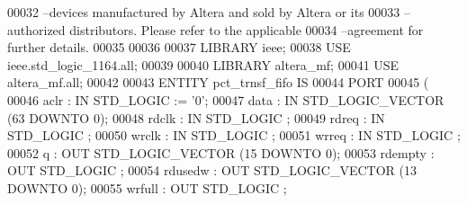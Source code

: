 \begin{DoxyCode}
{00032 \textcolor{keyword}{--devices manufactured by Altera and sold by Altera or its }
00033 \textcolor{keyword}{--authorized distributors.  Please refer to the applicable }
00034 \textcolor{keyword}{--agreement for further details.}
00035 
00036 
00037 \textcolor{vhdlkeyword}{LIBRARY }\textcolor{keywordflow}{ieee};
00038 \textcolor{vhdlkeyword}{USE }ieee.std\_logic\_1164.\textcolor{keywordflow}{all};
00039 
00040 \textcolor{vhdlkeyword}{LIBRARY }\textcolor{keywordflow}{altera\_mf};
00041 \textcolor{vhdlkeyword}{USE }\textcolor{keywordflow}{altera\_mf.all};
00042 
00043 \textcolor{keywordflow}{ENTITY }pct_trnsf_fifo \textcolor{keywordflow}{IS}
00044     \textcolor{keywordflow}{PORT}
00045     \textcolor{vhdlchar}{(}
00046         \textcolor{vhdlchar}{aclr}        \textcolor{vhdlchar}{:} \textcolor{keywordflow}{IN} \textcolor{comment}{STD\_LOGIC}  \textcolor{vhdlchar}{:=} \textcolor{vhdlchar}{'}\textcolor{vhdllogic}{}\textcolor{vhdllogic}{0}\textcolor{vhdlchar}{'};
00047         \textcolor{vhdlchar}{data}        \textcolor{vhdlchar}{:} \textcolor{keywordflow}{IN} \textcolor{comment}{STD\_LOGIC\_VECTOR} \textcolor{vhdlchar}{(}\textcolor{vhdllogic}{}\textcolor{vhdllogic}{63} \textcolor{keywordflow}{DOWNTO} \textcolor{vhdllogic}{}\textcolor{vhdllogic}{0}\textcolor{vhdlchar}{)};
00048         \textcolor{vhdlchar}{rdclk}       \textcolor{vhdlchar}{:} \textcolor{keywordflow}{IN} \textcolor{comment}{STD\_LOGIC} ;
00049         \textcolor{vhdlchar}{rdreq}       \textcolor{vhdlchar}{:} \textcolor{keywordflow}{IN} \textcolor{comment}{STD\_LOGIC} ;
00050         \textcolor{vhdlchar}{wrclk}       \textcolor{vhdlchar}{:} \textcolor{keywordflow}{IN} \textcolor{comment}{STD\_LOGIC} ;
00051         \textcolor{vhdlchar}{wrreq}       \textcolor{vhdlchar}{:} \textcolor{keywordflow}{IN} \textcolor{comment}{STD\_LOGIC} ;
00052         \textcolor{vhdlchar}{q}       \textcolor{vhdlchar}{:} \textcolor{keywordflow}{OUT} \textcolor{comment}{STD\_LOGIC\_VECTOR} \textcolor{vhdlchar}{(}\textcolor{vhdllogic}{}\textcolor{vhdllogic}{15} \textcolor{keywordflow}{DOWNTO} \textcolor{vhdllogic}{}\textcolor{vhdllogic}{0}\textcolor{vhdlchar}{)};
00053         \textcolor{vhdlchar}{rdempty}     \textcolor{vhdlchar}{:} \textcolor{keywordflow}{OUT} \textcolor{comment}{STD\_LOGIC} ;
00054         \textcolor{vhdlchar}{rdusedw}     \textcolor{vhdlchar}{:} \textcolor{keywordflow}{OUT} \textcolor{comment}{STD\_LOGIC\_VECTOR} \textcolor{vhdlchar}{(}\textcolor{vhdllogic}{}\textcolor{vhdllogic}{13} \textcolor{keywordflow}{DOWNTO} \textcolor{vhdllogic}{}\textcolor{vhdllogic}{0}\textcolor{vhdlchar}{)};
00055         \textcolor{vhdlchar}{wrfull}      \textcolor{vhdlchar}{:} \textcolor{keywordflow}{OUT} \textcolor{comment}{STD\_LOGIC} ;
}
\end{DoxyCode}
